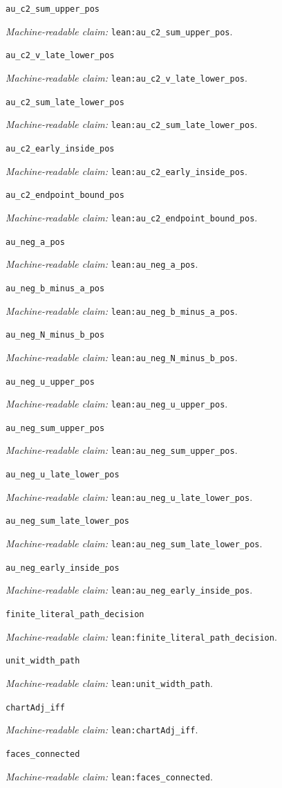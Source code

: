 \documentclass[11pt]{amsart}
\newcommand{\record}[1]{\nolinkurl{#1}}
\newcommand{\claimid}[1]{\par\nopagebreak\noindent\textit{Machine-readable claim:} \record{#1}.\par}
\begin{document}
\par\noindent\label{lean:au_c2_sum_upper_pos}\record{au_c2_sum_upper_pos}
\claimid{lean:au_c2_sum_upper_pos}
\par\noindent\label{lean:au_c2_v_late_lower_pos}\record{au_c2_v_late_lower_pos}
\claimid{lean:au_c2_v_late_lower_pos}
\par\noindent\label{lean:au_c2_sum_late_lower_pos}\record{au_c2_sum_late_lower_pos}
\claimid{lean:au_c2_sum_late_lower_pos}
\par\noindent\label{lean:au_c2_early_inside_pos}\record{au_c2_early_inside_pos}
\claimid{lean:au_c2_early_inside_pos}
\par\noindent\label{lean:au_c2_endpoint_bound_pos}\record{au_c2_endpoint_bound_pos}
\claimid{lean:au_c2_endpoint_bound_pos}
\par\noindent\label{lean:au_neg_a_pos}\record{au_neg_a_pos}
\claimid{lean:au_neg_a_pos}
\par\noindent\label{lean:au_neg_b_minus_a_pos}\record{au_neg_b_minus_a_pos}
\claimid{lean:au_neg_b_minus_a_pos}
\par\noindent\label{lean:au_neg_N_minus_b_pos}\record{au_neg_N_minus_b_pos}
\claimid{lean:au_neg_N_minus_b_pos}
\par\noindent\label{lean:au_neg_u_upper_pos}\record{au_neg_u_upper_pos}
\claimid{lean:au_neg_u_upper_pos}
\par\noindent\label{lean:au_neg_sum_upper_pos}\record{au_neg_sum_upper_pos}
\claimid{lean:au_neg_sum_upper_pos}
\par\noindent\label{lean:au_neg_u_late_lower_pos}\record{au_neg_u_late_lower_pos}
\claimid{lean:au_neg_u_late_lower_pos}
\par\noindent\label{lean:au_neg_sum_late_lower_pos}\record{au_neg_sum_late_lower_pos}
\claimid{lean:au_neg_sum_late_lower_pos}
\par\noindent\label{lean:au_neg_early_inside_pos}\record{au_neg_early_inside_pos}
\claimid{lean:au_neg_early_inside_pos}
\par\noindent\label{lean:finite_literal_path_decision}\record{finite_literal_path_decision}
\claimid{lean:finite_literal_path_decision}

\par\noindent\label{lean:unit_width_path}\record{unit_width_path}
\claimid{lean:unit_width_path}
\par\noindent\label{lean:chartAdj_iff}\record{chartAdj_iff}
\claimid{lean:chartAdj_iff}
\par\noindent\label{lean:faces_connected}\record{faces_connected}
\claimid{lean:faces_connected}
\end{document}
